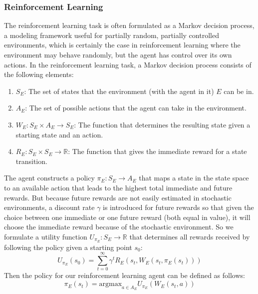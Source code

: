 \documentclass[twocolumn]{article}
\begin{document}
	\subsubsection*{Reinforcement Learning}
	The reinforcement learning task is often formulated as a Markov decision process, a modeling framework useful for partially random, partially controlled environments, which is certainly the case in reinforcement learning where the environment may behave randomly, but the agent has control over its own actions. In the reinforcement learning task, a Markov decision process consists of the following elements:
	\begin{enumerate}
		\item $S_E$: The set of states that the environment (with the agent in it) $E$ can be in. 
		\item $A_E$: The set of possible actions that the agent can take in the environment.
		\item $W_E:S_E \times A_E \to S_E$: The function that determines the resulting state given a starting state and an action.
		\item $R_E:S_E \times S_E \to \mathbb{R}$: The function that gives the immediate reward for a state transition.		
	\end{enumerate}
	The agent constructs a policy $\pi_E:S_E \to A_E$ that maps a state in the 
	state space to an available action that leads to the highest total 
	immediate and future rewards. But because future rewards are 
	not easily estimated in stochastic environments, a discount rate $\gamma$ 
	is introduced for future rewards so that given the choice between one 
	immediate or one future reward (both equal in value), it will choose the 
	immediate reward because of the stochastic environment. So we formulate a 
	utility function $U_{\pi_E}:S_E\to \mathbb R$ that determines all rewards 
	received by following the policy given a starting point $s_0$: 
	$$U_{\pi_E}(s_0) = \sum_{t=0}^\infty \gamma^t R_E(s_t, 
	W_E(s_t,\pi_E(s_t)))$$ 	Then the policy for our reinforcement learning 
	agent can be defined as follows: 
	$$\pi_E(s_t) = \text{argmax}_{a \in A_E}U_{\pi_E}(W_E(s_t, a))$$\\
	
\end{document}
